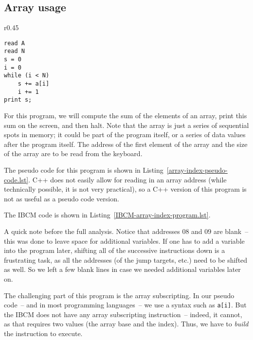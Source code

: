 \subsection{Array usage}

\begin{wrapfigure}{r}{0.45\textwidth}
\begin{lstlisting}[caption=Array index pseudo code,label={array-index-pseudo-code.lst},backgroundcolor=\color{white},frame=trBL,linewidth=3.2in,xleftmargin=0.25in]
read A
read N
s = 0
i = 0
while (i < N)
	s += a[i]
	i += 1
print s;
\end{lstlisting}
\vspace{-0.4in}
\end{wrapfigure}

For this program, we will compute the sum of the elements of an array,
print this sum on the screen, and then halt.  Note that the array is
just a series of sequential spots in memory; it could be part of the
program itself, or a series of data values after the program itself.
The address of the first element of the array and the size of the
array are to be read from the keyboard.

The pseudo code for this program is shown in
Listing~\ref{array-index-pseudo-code.lst}.  C++ does not easily allow
for reading in an array address (while technically possible, it is not
very practical), so a C++ version of this program is not as useful as
a pseudo code version.

The IBCM code is shown in Listing~\ref{IBCM-array-index-program.lst}.

\begin{figure}[h!]

\end{figure}

A quick note before the full analysis.  Notice that addresses 08
and 09 are blank~-- this was done to leave space for additional
variables.  If one has to add a variable into the program later,
shifting all of the successive instructions down is a frustrating
task, as all the addresses (of the jump targets, etc.)  need to be
shifted as well. So we left a few blank lines in case we needed
additional variables later on.

The challenging part of this program is the array subscripting.  In
our pseudo code~-- and in most programming languages~-- we use a syntax
such as {\tt a[i]}.  But the IBCM does not have any array subscripting
instruction~-- indeed, it cannot, as that requires two values (the
array base and the index). Thus, we have to {\em build} the
instruction to execute.

